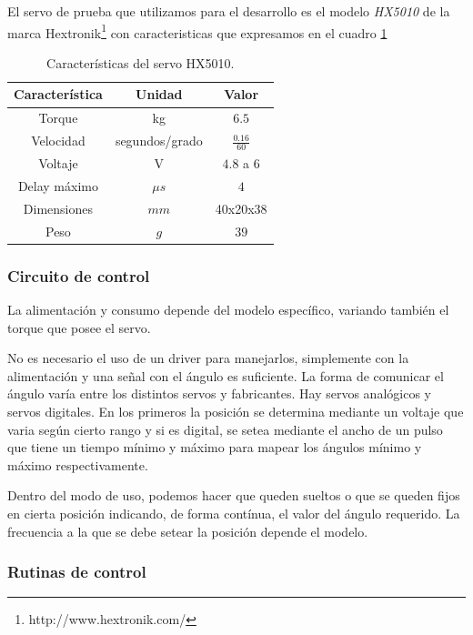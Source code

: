 El servo de prueba que utilizamos para el desarrollo es el modelo \emph{HX5010} de la marca Hextronik\footnote{http://www.hextronik.com/}
con caracteristicas que expresamos en el cuadro \ref{hT_hx5010}

\begin{table}
	\begin{center}
		\begin{tabular}{|c|c|c|}
			\hline
			Caracter\'istica & Unidad & Valor \\
			\hline
			Torque & kg & $6.5$ \\
			Velocidad & segundos/grado & $\frac{0.16}{60}$ \\
			Voltaje & V & $4.8$ a $6$ \\
			Delay m\'aximo & $\mu s$ & $4$ \\
			Dimensiones & $mm$ & 40x20x38 \\
			Peso & $g$ & $39$ \\
			\hline
		\end{tabular}
	\end{center}
	\caption{Caracter\'isticas del servo HX5010.}
	\label{hT_hx5010}
\end{table}

\subsubsection{Circuito de control}
\label{h_actuadores_servo_circuito}

La alimentaci\'on y consumo depende del modelo espec\'ifico, variando tambi\'en el torque que posee el servo.

No es necesario el uso de un driver para manejarlos, simplemente con la alimentaci\'on y una se\~nal con el \'angulo es suficiente.
La forma de comunicar el \'angulo var\'ia entre los distintos servos y fabricantes.
Hay servos anal\'ogicos y servos digitales.
En los primeros la posici\'on se determina mediante un voltaje que varia seg\'un cierto rango y si es digital, se setea mediante el ancho de
un pulso que tiene un tiempo m\'inimo y m\'aximo para mapear los \'angulos m\'inimo y m\'aximo respectivamente.

Dentro del modo de uso, podemos hacer que queden sueltos o que se queden fijos en cierta posici\'on indicando, de forma cont\'inua, el valor
del \'angulo requerido.
La frecuencia a la que se debe setear la posici\'on depende el modelo.

\subsubsection{Rutinas de control}
\label{h_actuadores_servo_rutinas}

